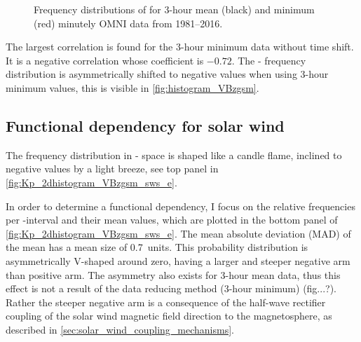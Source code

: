 \begin{figure}[htb]
\begin{floatrow}
{		}{
			\caption{Frequency distributions of \vBz{} for 3-hour mean (black) and minimum (red) minutely OMNI data from 1981--2016.}
			\label{fig:histogram_VBzgsm}
		}
	\end{floatrow}
\end{figure}
The largest correlation is found for the 3-hour minimum data without time shift. It is a negative correlation whose coefficient is $-0.72$. The \Kp{}-\vBz{} frequency distribution is asymmetrically shifted to negative values when using 3-hour minimum values, this is visible in \autoref{fig:histogram_VBzgsm}.


\subsection{Functional dependency for solar wind}
The frequency distribution in \Kp-\vBz{} space is shaped like a candle flame, inclined to negative values by a light breeze, see top panel in \autoref{fig:Kp_2dhistogram_VBzgsm_sws_e}.
\begin{figure}
\end{figure}
In order to determine a functional dependency, I focus on the relative frequencies per \vBz-interval and their mean \Kp{} values, which are plotted in the bottom panel of \autoref{fig:Kp_2dhistogram_VBzgsm_sws_e}. The mean absolute deviation (MAD) of the mean has a mean size of \SI{0.7}{\Kp}~units. This probability distribution is asymmetrically V-shaped around zero, having a larger and steeper negative arm than positive arm. The asymmetry also exists for 3-hour mean data, thus this effect is not a result of the data reducing method (3-hour minimum) (fig...?). Rather the steeper negative arm is a consequence of the half-wave rectifier coupling of the solar wind magnetic field direction to the magnetosphere, as described in \autoref{sec:solar_wind_coupling_mechanisms}.\\
